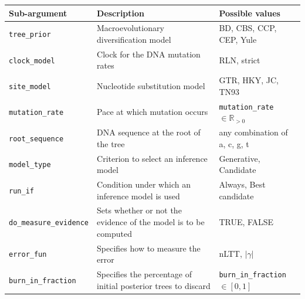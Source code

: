 \begin{table}
\centering
  \begin{tabular}{|p{3.4cm}|p{9.7cm}|p{4.5cm}@{}|}
    \hline
    \centering
    \textbf{Sub-argument} & 
    \textbf{Description} &
    \textbf{Possible values} \\ 
    \hline
    \verb;tree_prior; &
    Macroevolutionary diversification model &
    BD, CBS, CCP, CEP, Yule \\
    \verb;clock_model; &
    Clock for the DNA mutation rates &
    RLN, strict \\
    \verb;site_model; &
    Nucleotide substitution model &
    GTR, HKY, JC, TN93 \\
    \verb;mutation_rate; &
    Pace at which mutation occurs &
    \verb;mutation_rate; $\in \mathbb{R}_{>0}$\\
    \verb;root_sequence; &
    DNA sequence at the root of the tree &
    any combination of a, c, g, t \\
    \verb;model_type; &
    Criterion to select an inference model &
    Generative, Candidate \\
    \verb;run_if; &
    Condition under which an inference model is used &
    Always, Best candidate \\
    \verb;do_measure_evidence; &
    Sets whether or not the evidence of the model is to be computed &
    TRUE, FALSE \\
    \verb;error_fun; &
    Specifies how to measure the error &
    nLTT, $|\gamma|$ \\
    \verb;burn_in_fraction; &
    Specifies the percentage of initial posterior trees to discard &
    \verb;burn_in_fraction; $\in [0, 1]$\\

\end{tabular}
\end{table}
